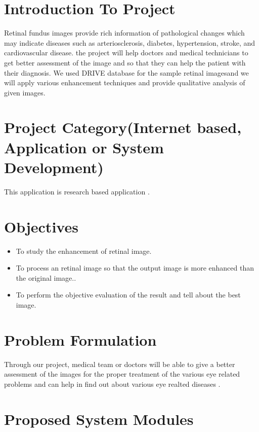 \section{Introduction To Project} 
Retinal fundus images provide rich information of pathological changes which may indicate
diseases such as arteriosclerosis, diabetes, hypertension, stroke, and cardiovascular disease.
the project will help doctors and medical technicians to get better assessment of the image
and so that they can help the patient with their diagnosis. We used DRIVE database for the
sample retinal imagesand we will apply various enhancement techniques and provide qualitative
analysis of given images.

\section{Project Category(Internet based, Application or System Development)}
This application is research based application .

\section{Objectives}

\begin{itemize}
	\item  To study the enhancement of retinal image.

	\item To process an retinal image so that the output image is more enhanced than the original image..
	
	\item To perform the objective evaluation of the result and tell about the best image.


\end{itemize}

\section{Problem Formulation}
Through our project, medical team or doctors will be able to give a better assessment of the images for the proper treatment of the various eye related problems and can help in find out about various eye realted diseases  .   

\section{Proposed System Modules}

